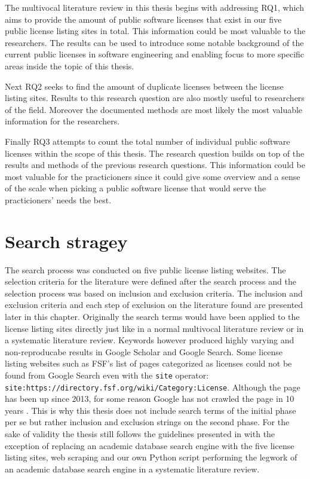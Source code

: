 The multivocal literature review in this thesis begins with addressing RQ1, which aims to provide the amount of public software licenses that exist in our five public license listing sites in total. This information could be most valuable to the researchers. The results can be used to introduce some notable background of the current public licenses in software engineering and enabling focus to more specific areas inside the topic of this thesis.

Next RQ2 seeks to find the amount of duplicate licenses between the license listing sites. Results to this research question are also mostly useful to researchers of the field. Moreover the documented methods are most likely the most valuable information for the researchers.

Finally RQ3 attempts to count the total number of individual public software licenses within the scope of this thesis. The research question builds on top of the results and methods of the previous research questions. This information could be most valuable for the practicioners since it could give some overview and a sense of the scale when picking a public software license that would serve the practicioners' needs the best.

\section{Search stragey}
The search process was conducted on five public license listing websites. The selection criteria for the literature were defined after the search process and the selection process was based on inclusion and exclusion criteria. The inclusion and exclusion criteria and each step of exclusion on the literature found are presented later in this chapter. Originally the search terms would have been applied to the license listing sites directly just like in a normal multivocal literature review or in a systematic literature review. Keywords however produced highly varying and non-reproducabe results in Google Scholar and Google Search. Some license listing websites such as FSF's list of pages categorized as licenses could not be found from Google Search even with the \texttt{site} operator: \\
\texttt{site:https://directory.fsf.org/wiki/Category:License}. Although the page has been up since 2013, for some reason Google has not crawled the page in 10 years \citep{fsf:licenselist}. This is why this thesis does not include search terms of the initial phase per se but rather inclusion and exclusion strings on the second phase. For the sake of validity the thesis still follows the guidelines presented in \cite{kitchenham2007} with the exception of replacing an academic database search engine with the five license listing sites, web scraping and our own Python script performing the legwork of an academic database search engine in a systematic literature review.

